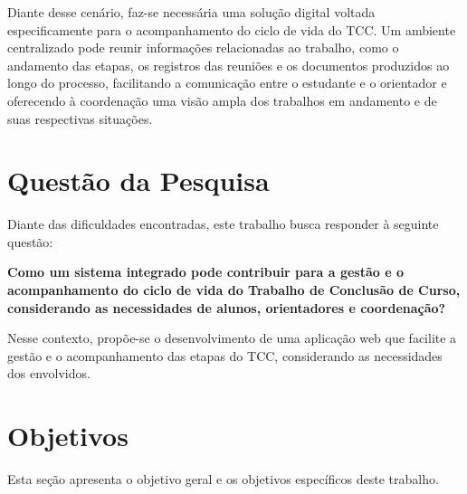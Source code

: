 Diante desse cenário, faz-se necessária uma solução digital voltada especificamente para o acompanhamento do ciclo de vida do TCC. Um ambiente centralizado pode reunir informações relacionadas ao trabalho, como o andamento das etapas, os registros das reuniões e os documentos produzidos ao longo do processo, facilitando a comunicação entre o estudante e o orientador e oferecendo à coordenação uma visão ampla dos trabalhos em andamento e de suas respectivas situações.



\section{Questão da Pesquisa}

Diante das dificuldades encontradas, este trabalho busca responder à seguinte questão:

\textbf{Como um sistema integrado pode contribuir para a gestão e o acompanhamento do ciclo de vida do Trabalho de Conclusão de Curso, considerando as necessidades de alunos, orientadores e coordenação?}

Nesse contexto, propõe-se o desenvolvimento de uma aplicação web que facilite a gestão e o acompanhamento das etapas do TCC, considerando as necessidades dos envolvidos.

\section{Objetivos}

Esta seção apresenta o objetivo geral e os objetivos específicos deste trabalho.

